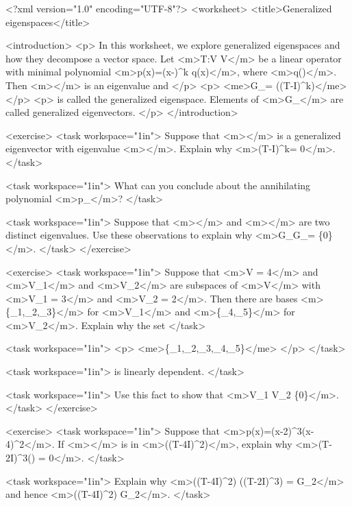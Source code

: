 <?xml version="1.0" encoding="UTF-8"?>
<worksheet>
  <title>Generalized eigenspaces</title>

  <introduction>
    <p>
      In this worksheet, we explore generalized eigenspaces and how they
      decompose a vector space. Let <m>T:V \to V</m> be a linear operator
      with minimal polynomial <m>p(x)=(x-\lambda)^k q(x)</m>, where
      <m>q(\lambda)</m>. Then <m>\lambda</m> is an eigenvalue and
    </p>
    <p>
      <me>G_\lambda = \nul((T-\lambda I)^k)</me>
    </p>
    <p>
      is called the generalized eigenspace. Elements of <m>G_\lambda</m>
      are called generalized eigenvectors.
    </p>
  </introduction>

  <exercise>
    <task workspace="1in">
      Suppose that <m>\vvec</m> is a generalized eigenvector with
      eigenvalue <m>\lambda</m>. Explain why
      <m>(T-\lambda I)^k\vvec = 0</m>.
    </task>

    <task workspace="1in">
      What can you conclude about the annihilating polynomial
      <m>p_\vvec</m>?
    </task>

    <task workspace="1in">
      Suppose that <m>\lambda</m> and <m>\mu</m> are two distinct eigenvalues.
      Use these observations to explain why
      <m>G_\lambda \cap G_\mu = \{0\}</m>.
    </task>
  </exercise>

  <exercise>
    <task workspace="1in">
      Suppose that <m>\dim V = 4</m> and <m>V_1</m> and <m>V_2</m> are subspaces
      of <m>V</m> with <m>\dim V_1 = 3</m> and <m>\dim V_2 = 2</m>. Then there
      are bases <m>\{\vvec_1,\vvec_2,\vvec_3\}</m> for <m>V_1</m> and
      <m>\{\vvec_4,\vvec_5\}</m> for <m>V_2</m>. Explain why the set
    </task>

    <task workspace="1in">
      <p>
        <me>\{\vvec_1,\vvec_2,\vvec_3,\vvec_4,\vvec_5\}</me>
      </p>
    </task>

    <task workspace="1in">
      is linearly dependent.
    </task>

    <task workspace="1in">
      Use this fact to show that
      <m>V_1 \cap V_2 \neq \{0\}</m>.
    </task>
  </exercise>

  <exercise>
    <task workspace="1in">
      Suppose that <m>p(x)=(x-2)^3(x-4)^2</m>. If <m>\wvec</m> is in
      <m>\range((T-4I)^2)</m>, explain why
      <m>(T-2I)^3(\wvec) = 0</m>.
    </task>

    <task workspace="1in">
      Explain why
      <m>\range((T-4I)^2) \subset \nul((T-2I)^3) = G_2</m> and hence
      <m>\dim \range((T-4I)^2) \leq \dim G_2</m>.
    </task>

